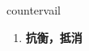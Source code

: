 
\begin{frame}
{\huge countervail}
\begin{center}
\begin{enumerate}\Large
  \item \textbf{抗衡，抵消}
\end{enumerate}
\end{center}
\end{frame}
